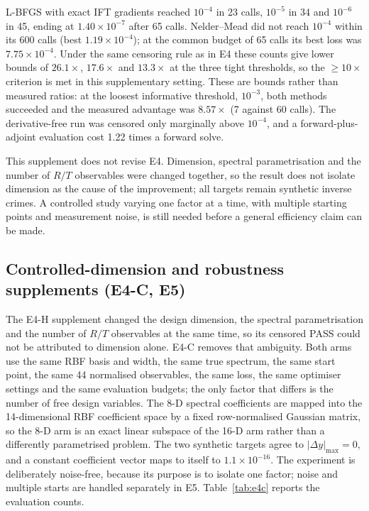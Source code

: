 \documentclass[preprint,12pt]{elsarticle}
\begin{document}
L-BFGS with exact IFT gradients reached $10^{-4}$ in 23 calls, $10^{-5}$ in
34 and $10^{-6}$ in 45, ending at $1.40\times10^{-7}$ after 65 calls.
Nelder--Mead did not reach $10^{-4}$ within its 600 calls (best
$1.19\times10^{-4}$); at the common budget of 65 calls its best loss was
$7.75\times10^{-4}$. Under the same censoring rule as in E4 these counts give
lower bounds of $26.1\times$, $17.6\times$ and $13.3\times$ at the three
tight thresholds, so the $\ge10\times$ criterion is met in this supplementary
setting. These are bounds rather than measured ratios: at the loosest
informative threshold, $10^{-3}$, both methods succeeded and the measured
advantage was $8.57\times$ (7 against 60 calls). The derivative-free run was
censored only marginally above $10^{-4}$, and a forward-plus-adjoint evaluation cost 1.22
times a forward solve.

This supplement does not revise E4. Dimension, spectral parametrisation and
the number of $R/T$ observables were changed together, so the result does not
isolate dimension as the cause of the improvement; all targets remain
synthetic inverse crimes. A controlled study varying one factor at a time,
with multiple starting points and measurement noise, is still needed before
a general efficiency claim can be made.

\subsection{Controlled-dimension and robustness supplements (E4-C, E5)}
\label{sec:supplements}

The E4-H supplement changed the design dimension, the spectral
parametrisation and the number of $R/T$ observables at the same time, so its
censored PASS could not be attributed to dimension alone. E4-C removes that
ambiguity. Both arms use the same RBF basis and width, the same true spectrum,
the same start point, the same 44 normalised observables, the same loss, the
same optimiser settings and the same evaluation budgets; the only factor that
differs is the number of free design variables. The 8-D spectral coefficients
are mapped into the 14-dimensional RBF coefficient space by a fixed
row-normalised Gaussian matrix, so the 8-D arm is an exact linear subspace of
the 16-D arm rather than a differently parametrised problem. The two synthetic
targets agree to $|\Delta y|_{\max} = 0$,
and a constant coefficient vector maps to itself to $1.1\times10^{-16}$.
The experiment is deliberately noise-free, because its purpose is to isolate
one factor; noise and multiple starts are handled separately in E5.
Table~\ref{tab:e4c} reports the evaluation counts.
\end{document}
